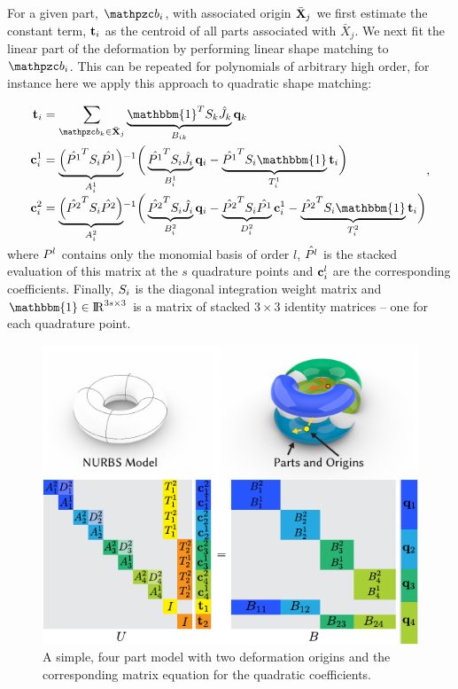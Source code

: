 For a given part, $\prt_i$, with associated origin $\bar{\mathbf{X}}_j$ we first estimate the constant term, $\mathbf{t}_i$ as the centroid of all parts associated with $\bar{X}_j$.
We next fit the linear part of the deformation by performing linear shape matching to $\prt_i$. 
This can be repeated for polynomials of arbitrary high order, for instance here we apply this approach to quadratic shape matching:

\begin{equation}
    \begin{split}
        \tr_i  & = \sum_{\prt_k \in \bar{\refX}_j} \underbrace{\mathbbm{1}^T\wt_k \samp{\Jnurbs}_k}_{B_{ik}}\vc{q}_k \\
        \vc{c}_i^1 & = \smash{\underbrace{\left(\samp{\Pmat^1}^T\wt_i\samp{\Pmat^1}\right)}_{A^1_i}}^{-1}\bigg(\underbrace{\samp{\Pmat^1}^T\wt_i\samp{\Jnurbs}_i}_{B^1_i}\vc{q}_i-\underbrace{\samp{\Pmat^1}^T\wt_i\mathbbm{1}}_{T^1_i}\tr_i\bigg)\\
        \vc{c}_i^2 & = \smash{\underbrace{\left(\samp{\Pmat^2}^T\wt_i\samp{\Pmat^2}\right)}_{A^2_i}}^{-1}\bigg(\underbrace{\samp{\Pmat^2}^T\wt_i\samp{\Jnurbs}_i}_{B^2_i}\vc{q}_i-\underbrace{\samp{\Pmat^2}^T\wt_i\samp{\Pmat^1}}_{D^2_i}\vc{c}_i^1 - \underbrace{\samp{\Pmat^2}^T\wt_i\mathbbm{1}}_{T^2_i}\tr_i\bigg)
    \end{split},
    \label{eq:hfit} 
\end{equation} where $P^l$ contains only the monomial basis of order $l$,  $\hat{P^l}$ is the stacked evaluation of this matrix at the $s$ quadrature points and $\mathbf{c}^l_i$ are the corresponding coefficients. 
Finally, $S_i$ is the diagonal integration weight matrix and $\mathbbm{1}\in\real^{3s\times3}$ is a matrix of stacked $3\times3$ identity matrices -- one for each quadrature point.

\begin{figure}[h]
    \includegraphics[width=\columnwidth]{figures/projection_operator_solve}
    \caption{A simple, four part model with two deformation origins and the corresponding matrix equation for the quadratic coefficients.}
    \label{fig:multiparts}
\end{figure}

